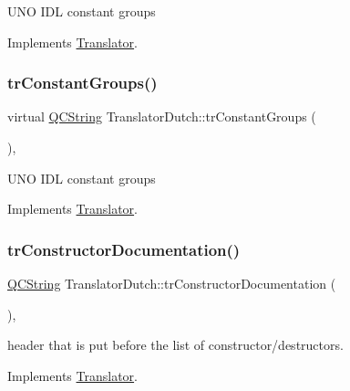 U\+NO I\+DL constant groups 

Implements \mbox{\hyperlink{class_translator}{Translator}}.

\mbox{\label{class_translator_dutch_a15af1193ad9ca4dd84f57359093035e0}} 
\subsubsection{\texorpdfstring{trConstantGroups()}{trConstantGroups()}}
{\footnotesize\ttfamily virtual \mbox{\hyperlink{class_q_c_string}{Q\+C\+String}} Translator\+Dutch\+::tr\+Constant\+Groups (\begin{DoxyParamCaption}{ }\end{DoxyParamCaption})\hspace{0.3cm}{\ttfamily [inline]}, {\ttfamily [virtual]}}

U\+NO I\+DL constant groups 

Implements \mbox{\hyperlink{class_translator}{Translator}}.

\mbox{\label{class_translator_dutch_a6710e7fd2ed997fc65f0cabe64102f2a}} 
\subsubsection{\texorpdfstring{trConstructorDocumentation()}{trConstructorDocumentation()}}
{\footnotesize\ttfamily \mbox{\hyperlink{class_q_c_string}{Q\+C\+String}} Translator\+Dutch\+::tr\+Constructor\+Documentation (\begin{DoxyParamCaption}{ }\end{DoxyParamCaption})\hspace{0.3cm}{\ttfamily [inline]}, {\ttfamily [virtual]}}

header that is put before the list of constructor/destructors. 

Implements \mbox{\hyperlink{class_translator}{Translator}}.

\mbox{\label{class_translator_dutch_ab7c37e72e5ff7bf579cfa1ee13de13e9}} 
